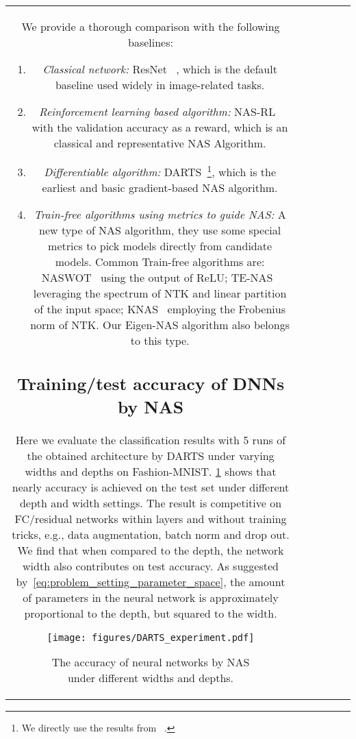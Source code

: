 \documentclass[nohyperref]{article}
\theoremstyle{plain}
\theoremstyle{definition}
\theoremstyle{remark}
\begin{document}
\begin{table*}[t]
\begin{threeparttable}
{\begin{tabular}{c|c|c|c|c|c}
We provide a thorough comparison with the following baselines: 

\begin{enumerate}[leftmargin=3.3mm]
    \itemsep-0.2em 
    \item \textit{Classical network:} ResNet ~\citep{7780459}, which is the default baseline used widely in image-related tasks. 
    \item \textit{Reinforcement learning based algorithm:} NAS-RL~\citep{45826} with the validation accuracy as a reward, which is an classical and representative NAS Algorithm.
    \item \textit{Differentiable algorithm:} DARTS~\citep{liu2019darts}\footnote{We directly use the results from ~\citet{pmlr-v139-xu21m}.}, which is the earliest and basic gradient-based NAS algorithm.
    \item \textit{Train-free algorithms using metrics to guide NAS:} A new type of NAS algorithm, they use some special metrics to pick models directly from candidate models. Common Train-free algorithms are: NASWOT~\citep{mellor2021neural} using the output of ReLU; TE-NAS~\citep{chen2021neural} leveraging the spectrum of NTK and linear partition of the input space; KNAS~\citep{pmlr-v139-xu21m} employing the Frobenius norm of NTK. Our Eigen-NAS algorithm also belongs to this type.
\end{enumerate}




\subsection{Training/test accuracy of DNNs by NAS}

Here we evaluate the classification results with 5 runs of the obtained architecture by DARTS under varying widths  and depths  on Fashion-MNIST.
\cref{fig:DARTS_experiment} shows that nearly  accuracy is achieved on the test set under different depth and width settings.
The result is competitive on FC/residual networks within  layers and without training tricks, e.g., data augmentation, batch norm and drop out. 
We find that when compared to the depth, the network width also contributes on test accuracy. As suggested by~\cref{eq:problem_setting_parameter_space}, the amount of parameters in the neural network is approximately proportional to the depth, but squared to the width. 

\begin{figure}[t]
\centering
    \texttt{[image: figures/DARTS\_experiment.pdf]}\vspace{-5mm}
\caption{The accuracy of neural networks by NAS under different widths and depths.}
\label{fig:DARTS_experiment}
\end{figure}


\end{tabular}}
\end{threeparttable}
\end{table*}
\end{document}
